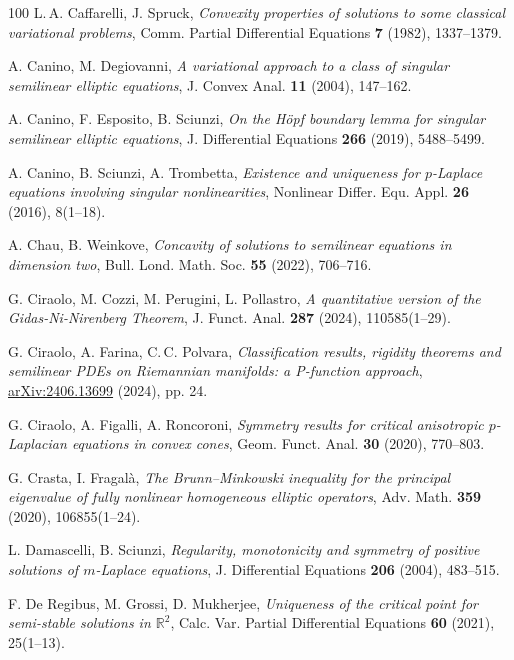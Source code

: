 \documentclass[11pt, reqno]{amsart}
\theoremstyle{definition}
\numberwithin{equation}{section}
\newcommand{\R}{\mathbb{R}}
\begin{document}
\begin{thebibliography}{100}
 L.$\,$A. Caffarelli, J. Spruck,
\emph{Convexity properties of solutions to some classical variational problems},
Comm. Partial Differential Equations \textbf{7} (1982), %
1337--1379.

 A. Canino, M. Degiovanni,
\emph{A variational approach to a class of singular semilinear elliptic equations},
J. Convex Anal. \textbf{11} (2004), %
147--162.

 A. Canino, F. Esposito, B. Sciunzi,
\emph{On the Höpf boundary lemma for singular semilinear elliptic equations},
J. Differential Equations \textbf{266} (2019), %
5488--5499.

 A. Canino, B. Sciunzi, A. Trombetta,
\emph{Existence and uniqueness for $p$-Laplace equations involving singular nonlinearities},
Nonlinear Differ. Equ. Appl. \textbf{26} (2016), %
8(1--18).

 A. Chau, B. Weinkove,
\emph{Concavity of solutions to semilinear equations in dimension two},
Bull. Lond. Math. Soc. \textbf{55} (2022), %
706--716.

 G. Ciraolo, M. Cozzi, M. Perugini, L. Pollastro,
\emph{A quantitative version of the Gidas-Ni-Nirenberg Theorem},
J. Funct. Anal. \textbf{287} (2024), %
110585(1--29).

 G. Ciraolo, A. Farina, C.$\,$C. Polvara,
\emph{Classification results, rigidity theorems and semilinear PDEs on Riemannian manifolds: a P-function approach},
\href{https://doi.org/10.48550/arXiv.2406.13699}{arXiv:2406.13699} (2024), pp. 24.

 G. Ciraolo, A. Figalli, A. Roncoroni,
\emph{Symmetry results for critical anisotropic $p$-Laplacian equations in convex cones},
Geom. Funct. Anal. \textbf{30} (2020), 770--803.

 G. Crasta, I. Fragalà,
\emph{The Brunn–Minkowski inequality for the principal eigenvalue of fully nonlinear homogeneous elliptic operators},
Adv. Math. \textbf{359} (2020), %
106855(1--24).

 L. Damascelli, B. Sciunzi,
\emph{Regularity, monotonicity and symmetry of positive solutions of $m$-Laplace equations},
J. Differential Equations \textbf{206} (2004), %
483--515.

 F. De Regibus, M. Grossi, D. Mukherjee,
\emph{Uniqueness of the critical point for semi-stable solutions in $\R^2$},
Calc. Var. Partial Differential Equations \textbf{60} (2021), %
25(1--13).


\end{thebibliography}
\end{document}
